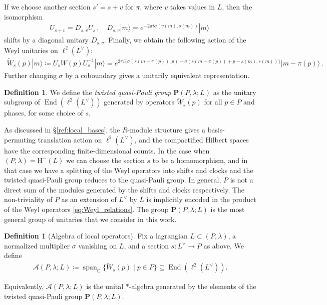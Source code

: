 \documentclass[sn-mathphys-num]{sn-jnl}
\theoremstyle{definition}
\newtheorem{definition}[lemma]{Definition}
\numberwithin{equation}{section}
\theoremstyle{definition}
\def\CA{{\mathcal A}}
\def\hm{{\mbox{H}}^{-}}
\def\IC{\mathbb{C}}
\def\ra{\rangle}
\def\End{\operatorname{End}}
\def\l{{\lambda}}
\begin{document}
If we choose another section $s'=s+v$ for $\pi$, where $v$ takes values in $L$, then the isomorphism 
\begin{align}
    U_{s+v}=D_{s,v}U_s\,,\quad D_{s,v}|m\ra=e^{-2\pi i\sigma(v(m),s(m))}|m\ra\,
\end{align}
shifts by a diagonal unitary $D_{s,v}$. Finally, we obtain the following action of the Weyl unitaries on $\ell^2(L^{\vee})$:
\begin{align}
    \widetilde{W}_s(p)|m\ra\coloneqq U_sW(p)U_s^{-1}|m\ra=e^{2\pi i \{\sigma(s(m-\pi(p)),p)-\sigma(s(m-\pi(p))+p-s(m),s(m))\}}|m-\pi(p)\ra\,.
\end{align}
Further changing $\sigma$ by a coboundary gives a unitarily equivalent representation.

\begin{definition}
    We define the \textit{twisted quasi-Pauli group} $\textbf{P}(P,\l;L)$ 
 as the unitary subgroup of $\End(\ell^2(L^{\vee}))$ generated by operators $\widetilde{W}_s(p)$ for all $p\in P$ and phases, for some choice of $s$.
 
\end{definition}
As discussed in \S\ref{ref:local_bases}, the $R$-module structure gives a basis-permuting translation action on $\ell^2(L^{\vee})$, and the compactified Hilbert spaces have the corresponding finite-dimensional counts. In the case when $(P,\l)=\hm(L)$ we can choose the section $s$ to be a homomorphism, and in that case we have a splitting of the Weyl operators into shifts and clocks and the twisted quasi-Pauli group reduces to the quasi-Pauli group. In general, $P$ is not a direct sum of the modules generated by the shifts and clocks respectively. The non-triviality of $P$ as an extension of $L^{\vee}$ by $L$ is implicitly encoded in the product of the Weyl operators \eqref{eq:Weyl_relations}. The group $\textbf{P}(P,\l;L)$ is the most general group of unitaries that we consider in this work. 

\begin{definition}[Algebra of local operators] \label{def:local_operator_algebra} Fix a lagrangian $L\subset(P,\l)$, a normalized multiplier $\sigma$ vanishing on $L$, and a section $s:L^{\vee}\to P$ as above. We define 
\begin{align} \CA(P,\l;L) \coloneqq \operatorname{span}_{\IC} \{\widetilde W_s(p)\mid p\in P\} \subseteq \End(\ell^2(L^{\vee})). 
\end{align} 
\end{definition}
Equivalently, $\CA(P,\l;L)$ is the unital $*$-algebra generated by the elements of the twisted quasi-Pauli group $\textbf{P}(P,\l;L)$. 
\end{document}
